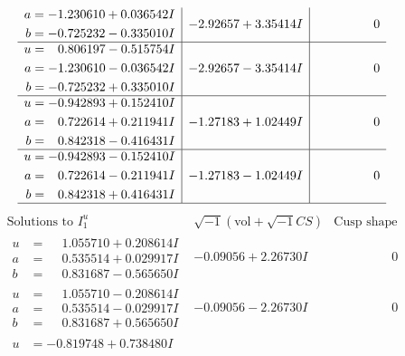 \documentclass[1p]{elsarticle_modified}
\theoremstyle{definition}
\newcommand{\I}{\sqrt{-1}}
\begin{document}
$$\begin{array}{c|c|c}
\begin{aligned}
a &= -1.230610 + 0.036542 I \\
b &= -0.725232 - 0.335010 I\end{aligned}
 & -2.92657 + 3.35414 I & \phantom{-0.000000 } 0 \\ \hline\begin{aligned}
u &= \phantom{-}0.806197 - 0.515754 I \\
a &= -1.230610 - 0.036542 I \\
b &= -0.725232 + 0.335010 I\end{aligned}
 & -2.92657 - 3.35414 I & \phantom{-0.000000 } 0 \\ \hline\begin{aligned}
u &= -0.942893 + 0.152410 I \\
a &= \phantom{-}0.722614 + 0.211941 I \\
b &= \phantom{-}0.842318 - 0.416431 I\end{aligned}
 & -1.27183 + 1.02449 I & \phantom{-0.000000 } 0 \\ \hline\begin{aligned}
u &= -0.942893 - 0.152410 I \\
a &= \phantom{-}0.722614 - 0.211941 I \\
b &= \phantom{-}0.842318 + 0.416431 I\end{aligned}
 & -1.27183 - 1.02449 I & \phantom{-0.000000 } 0\\
 \hline 
 \end{array}$$\newpage$$\begin{array}{c|c|c}  
\text{Solutions to }I^u_{1}& \I (\text{vol} + \sqrt{-1}CS) & \text{Cusp shape}\\
 \hline 
\begin{aligned}
u &= \phantom{-}1.055710 + 0.208614 I \\
a &= \phantom{-}0.535514 + 0.029917 I \\
b &= \phantom{-}0.831687 - 0.565650 I\end{aligned}
 & -0.09056 + 2.26730 I & \phantom{-0.000000 } 0 \\ \hline\begin{aligned}
u &= \phantom{-}1.055710 - 0.208614 I \\
a &= \phantom{-}0.535514 - 0.029917 I \\
b &= \phantom{-}0.831687 + 0.565650 I\end{aligned}
 & -0.09056 - 2.26730 I & \phantom{-0.000000 } 0 \\ \hline\begin{aligned}
u &= -0.819748 + 0.738480 I \\

\end{aligned}
\end{array}$$
\end{document}
